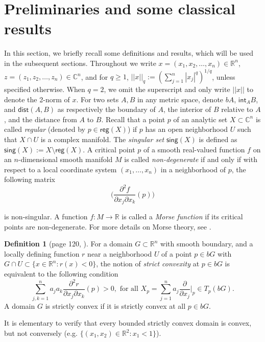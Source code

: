 \documentclass[12pt,reqno, a4paper]{amsart}
\theoremstyle{definition}
\theoremstyle{definition}
\newtheorem{definition}[theorem]{Definition}
\numberwithin{equation}{section}
\def\R{\mathbb{R}}                              %
\def\C{\mathbb{C}}                              %
\begin{document}


\section{Preliminaries and some classical results}\label{sec_2}
In this section, we briefly recall some definitions and results, which will be used in the subsequent sections. Throughout we write $x=(x_1,x_2,\ldots,x_n)\in \R^n$, $z=(z_1,z_2,\ldots,z_n)\in \C^n$, and for $q\geq 1$, $||x||_q:=(\sum_{j=1}^{n}|x_j|^q)^{1/q}$, unless specified otherwise. When $q=2$, we omit the superscript and only write $||x||$ to denote the 2-norm of $x$. For two sets $A,B$ in any metric space, denote $bA$, $\textsf{int}_AB$, and $\textsf{dist}(A,B)$ as respectively the boundary of $A$, the interior of $B$ relative to $A$, and the distance from $A$ to $B$. Recall that a point $p$ of an analytic set $X\subset \C^n$ is called \textit{regular} (denoted by $p\in \textsf{reg}(X)$) if $p$ has an open neighborhood
$U$ such that $X \cap U$ is a complex manifold. The \textit{singular set} $\textsf{sing}(X)$ is defined as $\textsf{sing}(X):=X\setminus \textsf{reg}(X).$ A critical point $p$ of a smooth real-valued function $f$ on an $n$-dimensional smooth manifold $M$ is called \textit{non-degenerate} if and only if with respect to a local coordinate system $(x_1,\ldots,x_n)$ in a neighborhood of $p$, the following matrix 
\begin{equation}\label{hessian}
	\Big(\frac{\partial^2f}{\partial {x_j}\partial x_k}(p)\Big)
\end{equation}

\noindent is non-singular. A function $f : M \to \R$ is called a \textit{Morse function} if its critical points are non-degenerate.
For more details on Morse theory, see \cite{milnor}.

\begin{definition}[page 120, \cite{kra}]\label{def-st-convexity}
For a domain $G \subset \R^n$ with smooth boundary, and a locally defining function $r$ near a neighborhood $U$ of a point $p \in bG$ with $G \cap U\subset\{x\in \R^n : r(x)<0\}$, the notion of \textit{strict convexity} at $p \in bG$ is equivalent to the following condition $$\sum \limits_{j,k =1}^{n} {a_j} a_k  \frac{\partial^2r}{\partial {x_j}\partial x_k}(p) > 0, \text{ for all } X_p = \sum \limits_{j =1}^{n} a_j \frac{\partial}{\partial x_j}\Bigr\rvert_p \in T_{p}(bG).$$
A domain $G$ is strictly convex if it is strictly convex at all $p \in bG$.	
\end{definition}
 It is elementary to verify that every bounded strictly convex domain is convex, but not conversely (e.g. $\{(x_1,x_2)\in \R^2: x_1<1\}$). \\
\end{document}
